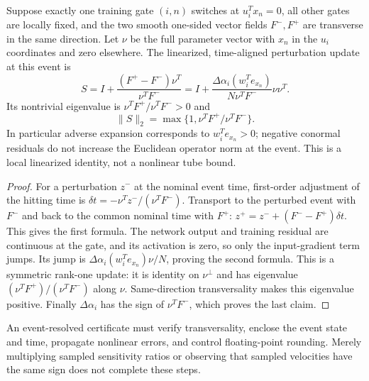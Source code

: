 \begin{proposition}
\label{prop:saltation}
Suppose exactly one training gate $(i,n)$ switches at $u_i^Tx_n=0$,
all other gates are locally fixed, and the two smooth one-sided vector fields
$F^-,F^+$ are transverse in the same direction. Let $\nu$ be the full
parameter vector with $x_n$ in the $u_i$ coordinates and zero elsewhere.
The linearized, time-aligned perturbation update at this event is
\[
 S=I+\frac{(F^+-F^-)\nu^T}{\nu^TF^-}
  =I+\frac{\Delta\alpha_i(w_i^Te_{x_n})}
                  {N\nu^TF^-}\nu\nu^T.
\]
Its nontrivial eigenvalue is
$\nu^TF^+/\nu^TF^->0$ and
\[
 \|S\|_2=\max\{1,\nu^TF^+/\nu^TF^-\}.
\]
In particular adverse expansion corresponds to $w_i^Te_{x_n}>0$;
negative conormal residuals do not increase the Euclidean operator norm
at the event. This is a local linearized identity, not a nonlinear tube bound.
\end{proposition}
\begin{proof}
For a perturbation $z^-$ at the nominal event time, first-order adjustment
of the hitting time is $\delta t=-\nu^Tz^-/(\nu^TF^-)$.
Transport to the perturbed event with $F^-$ and back to the common nominal
time with $F^+$: $z^+=z^-+(F^--F^+)\delta t$. This gives the first formula.
The network output and training residual are continuous at the gate, and
its activation is zero, so only the input-gradient term jumps. Its jump
is $\Delta\alpha_i(w_i^Te_{x_n})\nu/N$, proving the second formula.
This is a symmetric rank-one update: it is identity on $\nu^\perp$ and
has eigenvalue $(\nu^TF^+)/ (\nu^TF^-)$ along $\nu$. Same-direction
transversality makes this eigenvalue positive. Finally
$\Delta\alpha_i$ has the sign of $\nu^TF^-$, which proves the last claim.
\end{proof}
An event-resolved certificate must verify transversality, enclose the event
state and time, propagate nonlinear errors, and control floating-point
rounding. Merely multiplying sampled sensitivity ratios or observing that
sampled velocities have the same sign does not complete these steps.

